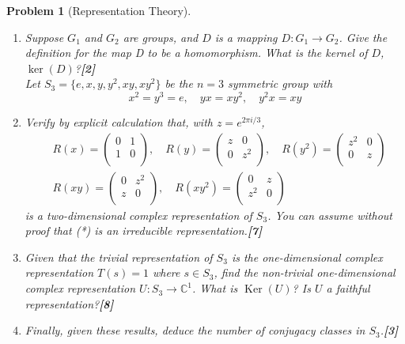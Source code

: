 \documentclass[a4paper]{article}
\DeclareMathOperator{\Ker}{Ker}
\theoremstyle{new}
\newtheorem{qns}{Problem}[section]
\begin{document}
\begin{qns}[Representation Theory]
\begin{enumerate}[label=(\roman*)]
\item Suppose $G_1$ and $G_2$ are groups, and $D$ is a mapping $D : G_1\rightarrow G_2$. Give the definition for the map D to be a homomorphism. What is the kernel of $D$, $\ker(D)$?\hfill\textbf{[2]}\\[5pt]
Let $S_3 = \{e, x, y, y^2, xy, xy^2\}$ be the $n = 3$ symmetric group with
$$x^2=y^3=e,\quad yx=xy^2,\quad y^2x=xy$$
\item Verify by explicit calculation that, with $z=e^{2\pi i/3}$,
\begin{align}
    &R(x)=\begin{pmatrix}0&1\\1&0\\\end{pmatrix},\quad R(y)=\begin{pmatrix}z&0\\0&z^2\\\end{pmatrix},\quad R(y^2)=\begin{pmatrix}z^2&0\\0&z\\\end{pmatrix}\nonumber\\&R(xy)=\begin{pmatrix}0&z^2\\z&0\\\end{pmatrix},\quad R(xy^2)=\begin{pmatrix}0&z\\z^2&0\\\end{pmatrix}\tag{*}
\end{align}
is a two-dimensional complex representation of $S_3$. You can assume without proof that (*) is an irreducible representation.\hfill\textbf{[7]}
\item Given that the trivial representation of $S_3$ is the one-dimensional complex representation $T(s) = 1$ where $s\in S_3$, find the non-trivial one-dimensional complex representation $U:S_3\rightarrow\mathbb{C}^1$. What is $\Ker(U)$? Is $U$ a faithful representation?\hfill\textbf{[8]}
\item Finally, given these results, deduce the number of conjugacy classes in $S_3$.\hfill\textbf{[3]}
\end{enumerate}
\end{qns}
\end{document}
